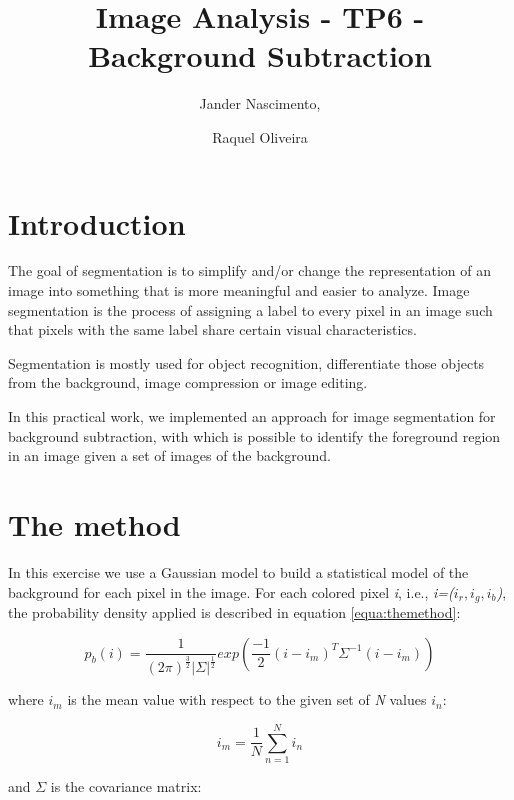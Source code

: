 \documentclass{article}
\begin{document}
\title{Image Analysis - TP6 - Background Subtraction}

\author{Jander Nascimento, 
\and Raquel Oliveira}

\maketitle

\section{Introduction}

The goal of segmentation is to simplify and/or change the representation of an image into something that is more meaningful and easier to analyze. Image segmentation is the process of assigning a label to every pixel in an image such that pixels with the same label share certain visual characteristics.\cite{introduction}

Segmentation is mostly used for object recognition, differentiate those objects from the background, image compression or image editing.

In this practical work, we implemented an approach for image segmentation for background subtraction, with which is possible to identify the foreground region in an image given a set of images of the background.


\section{The method}

In this exercise we use a Gaussian model to build a statistical model of the background for each pixel in the image. For each colored pixel \textit{i}, i.e., \textit{i=($i_r, i_g, i_b$)}, the probability density applied is described in equation \ref{equa:themethod}:

\begin{equation}
	p_b(i)=\frac{1}{(2\pi)^{\frac{3}{2}}|\Sigma|^{\frac{1}{2}}}exp(\frac{-1}{2}(i-i_m)^T\Sigma^{-1}(i-i_m))
\label{equa:themethod}
\end{equation}

where {$i_m$} is the mean value with respect to the given set of \textit{N} values {$i_n$}:

\begin{equation}
	i_m = \frac{1}{N}\sum_{n=1}^{N}{i_n}
\end{equation}

and {$\Sigma$} is the covariance matrix:
\end{document}
